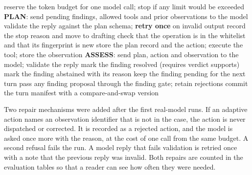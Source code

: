\begin{algorithm}[H]
\caption{One investigation turn}
\label{alg:turn}
\begin{algorithmic}[1]
\State reserve the token budget for one model call; stop if any limit would be exceeded
\State \textbf{PLAN}: send pending findings, allowed tools and prior observations to the model
\State validate the reply against the plan schema; \textbf{retry once} on invalid output
    \State record the stop reason and move to drafting
\Else
    \State check that the operation is in the whitelist and that its fingerprint is new
    \State store the plan record and the action; execute the tool; store the observation
    \State \textbf{ASSESS}: send plan, action and observation to the model; validate the reply
     \State mark the finding resolved (requires verdict supports)
     \State mark the finding abstained with its reason
    \Else \State keep the finding pending for the next turn
    \EndIf
    \State pass any finding proposal through the finding gate; retain rejections
\EndIf
\State commit the turn manifest with a compare-and-swap version
\end{algorithmic}
\end{algorithm}

Two repair mechanisms were added after the first real-model runs. If an adaptive action names an observation
identifier that is not in the case, the action is never dispatched or corrected. It is recorded as a rejected
action, and the model is asked once more with the reason, at the cost of one call from the same budget. A second
refusal fails the run. A model reply that fails validation is retried once with a note that the previous reply
was invalid. Both repairs are counted in the evaluation tables so that a reader can see how often they were
needed.

